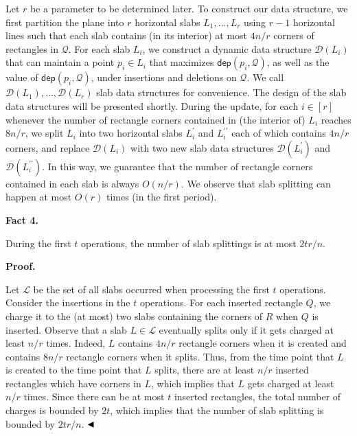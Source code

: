\documentclass[10pt,a4paper]{article}
\begin{document}
\par
\par
Let $r$ be a parameter to be determined later. To construct our data structure, we first partition the plane into $r$ horizontal slabs $L_{1},\dots,L_{r}$ using $r-1$ horizontal lines such that each slab contains (in its interior) at most $4n/r$ corners of rectangles in $\mathcal{Q}$. For each slab $L_{i}$, we construct a dynamic data structure $\mathcal{D}(L_{i})$ that can maintain a point $p_{i}\in L_{i}$ that maximizes $\mathsf{dep}(p_{i},\mathcal{Q})$, as well as the value of $\mathsf{dep}(p_{i},\mathcal{Q})$, under insertions and deletions on $\mathcal{Q}$. We call $\mathcal{D}(L_{1}),\dots,\mathcal{D}(L_{r})$ slab data structures for convenience. The design of the slab data structures will be presented shortly. During the update, for each $i\in[r]$ whenever the number of rectangle corners contained in (the interior of) $L_{i}$ reaches $8n/r$, we split $L_{i}$ into two horizontal slabs $L_{i}^{\prime}$ and $L_{i}^{\prime\prime}$ each of which contains $4n/r$ corners, and replace $\mathcal{D}(L_{i})$ with two new slab data structures $\mathcal{D}(L_{i}^{\prime})$ and $\mathcal{D}(L_{i}^{\prime\prime})$. In this way, we guarantee that the number of rectangle corners contained in each slab is always $O(n/r)$. We observe that slab splitting can happen at most $O(r)$ times (in the first period).
\par
\par
\par\medskip\noindent\textbf{Fact 4.}\par
During the first $t$ operations, the number of slab splittings is at most $2tr/n$.
\par
\par
\par
\par\medskip\noindent\textbf{Proof.}\par
Let $\mathcal{L}$ be the set of all slabs occurred when processing the first $t$ operations. Consider the insertions in the $t$ operations. For each inserted rectangle $Q$, we charge it to the (at most) two slabs containing the corners of $R$ when $Q$ is inserted. Observe that a slab $L\in\mathcal{L}$ eventually splits only if it gets charged at least $n/r$ times. Indeed, $L$ contains $4n/r$ rectangle corners when it is created and contains $8n/r$ rectangle corners when it splits. Thus, from the time point that $L$ is created to the time point that $L$ splits, there are at least $n/r$ inserted rectangles which have corners in $L$, which implies that $L$ gets charged at least $n/r$ times. Since there can be at most $t$ inserted rectangles, the total number of charges is bounded by $2t$, which implies that the number of slab splitting is bounded by $2tr/n$. $\hfill\blacktriangleleft$
\end{document}
